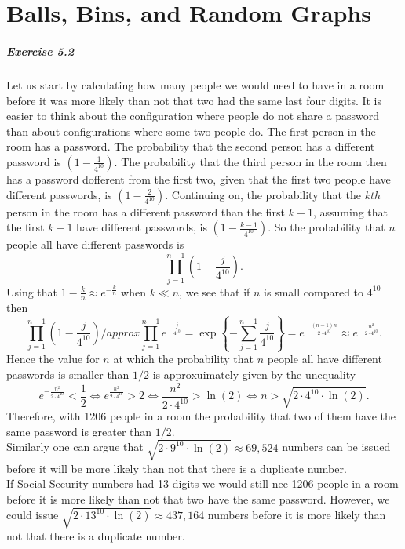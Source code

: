 \chapter{Balls, Bins, and Random Graphs}

\paragraph{Exercise 5.2} Let us start by calculating how many people we would
need to have in a room before it was more likely than not that two had the
same last four digits. It is easier to think about the configuration where
people do not share a password than about configurations where some two people
do. The first person in the room has a password. The probability that the second
person has a different password is $\left(1- \frac{1}{4^{10}}\right)$. The
probability that the third person in the room then has a password dofferent from
the first two, given that the first two people have different passwords, is
$\left(1- \frac{2}{4^{10}}\right)$. Continuing on, the probability that the
$kth$ person in the room has a different password than the first $k-1$,
assuming that the first $k-1$ have different passwords, is
$\left(1- \frac{k-1}{4^{10}}\right)$. So the probability that $n$ people all
have different passwords is
\[
  \prod_{j=1}^{n-1} \left( 1 - \frac{j}{4^{10}}\right).
\]
Using that $1 - \frac{k}{n} \approx e^{-\frac{k}{n}}$ when $k \ll n$, we see that
if $n$ is small compared to $4^{10}$ then
\[
  \prod_{j=1}^{n-1} \left( 1 - \frac{j}{4^{10}}\right)
  /approx \prod_{j=1}^{n-1} e^{-\frac{j}{4^{10}}}
  = \exp \left\{ - \sum_{j=1}^{n-1} \frac{j}{4^{10}} \right\}
  = e^{-\frac{(n-1)n}{2 \cdot 4^{10}}}
  \approx e^{-\frac{n^2}{2 \cdot 4^{10}}}.
\]
Hence the value for $n$ at which the probability that $n$ people all have
different passwords is smaller than $1/2$ is approxuimately given by the
unequality
\[
  e^{-\frac{n^2}{2 \cdot 4^{10}}} < \frac{1}{2}
  \Leftrightarrow e^{\frac{n^2}{2 \cdot 4^{10}}} > 2
  \Leftrightarrow \frac{n^2}{2 \cdot 4^{10}} > \ln(2)
  \Leftrightarrow n > \sqrt{2 \cdot 4^{10} \cdot \ln(2)}.
\]
Therefore, with 1206 people in a room the probability that two of them have
the same password is greater than $1/2$. \\
Similarly one can argue that $\sqrt{2 \cdot 9^{10} \cdot \ln(2)} \approx 69,524$
numbers can be issued before it will be more likely than not that there is a
duplicate number. \\
If Social Security numbers had 13 digits we would still nee 1206 people in a room
before it is more likely than not that two have the same password. However, we
could issue $\sqrt{2 \cdot 13^{10} \cdot \ln(2)} \approx 437,164$ numbers before
it is more likely than not that there is a duplicate number.

